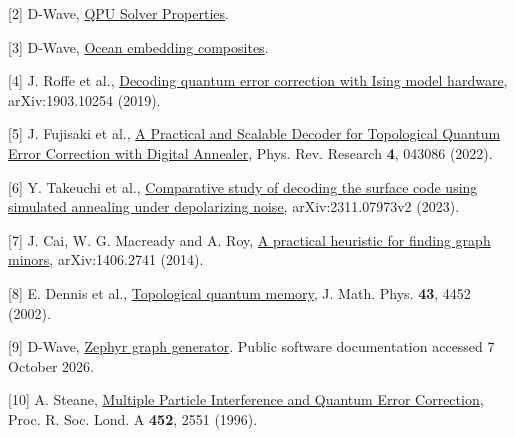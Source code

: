\documentclass[11pt,letterpaper]{article}
\begin{document}
{\small [2] D-Wave, \href{https://docs.dwavequantum.com/en/latest/quantum_research/solver_properties_all.html}{QPU Solver Properties}.\par}\vspace{5pt}

{\small [3] D-Wave, \href{https://docs.dwavequantum.com/en/latest/ocean/api_ref_system/composites.html}{Ocean embedding composites}.\par}\vspace{5pt}

{\small [4] J. Roffe et al., \href{https://arxiv.org/abs/1903.10254}{Decoding quantum error correction with Ising model hardware}, arXiv:1903.10254 (2019).\par}\vspace{5pt}

{\small [5] J. Fujisaki et al., \href{https://arxiv.org/abs/2203.15304}{A Practical and Scalable Decoder for Topological Quantum Error Correction with Digital Annealer}, Phys. Rev. Research \textbf{4}, 043086 (2022).\par}\vspace{5pt}

{\small [6] Y. Takeuchi et al., \href{https://arxiv.org/abs/2311.07973}{Comparative study of decoding the surface code using simulated annealing under depolarizing noise}, arXiv:2311.07973v2 (2023).\par}\vspace{5pt}

{\small [7] J. Cai, W. G. Macready and A. Roy, \href{https://arxiv.org/abs/1406.2741}{A practical heuristic for finding graph minors}, arXiv:1406.2741 (2014).\par}\vspace{5pt}

{\small [8] E. Dennis et al., \href{https://arxiv.org/abs/quant-ph/0110143}{Topological quantum memory}, J. Math. Phys. \textbf{43}, 4452 (2002).\par}\vspace{5pt}

{\small [9] D-Wave, \href{https://docs.dwavequantum.com/en/latest/ocean/api_ref_graphs/generated/dwave.graphs.zephyr_graph.html}{Zephyr graph generator}. Public software documentation accessed 7 October 2026.\par}\vspace{5pt}

{\small [10] A. Steane, \href{https://arxiv.org/abs/quant-ph/9601029}{Multiple Particle Interference and Quantum Error Correction}, Proc. R. Soc. Lond. A \textbf{452}, 2551 (1996).
\par}\vspace{5pt}
\end{document}
